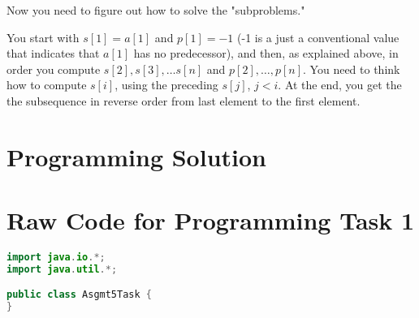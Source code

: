 \documentclass[11pt]{article}
\begin{document}
Now you need to figure out how to solve the "subproblems."

You start with $s[1] = a[1]$ and $p[1] = -1$ (-1 is a just a conventional value that indicates that $a[1]$ has no predecessor), and then, as explained above, in order you compute $s[2], s[3], \ldots s[n]$ and $p[2], \ldots, p[n]$. You need to think how to compute $s[i]$, using the preceding $s[j]$, $j < i$. At the end, you get the the subsequence in reverse order from last element to the first element.
\newpage
\section*{Programming Solution}

\newpage
\section*{Raw Code for Programming Task 1 }
\lstset{
    basicstyle=\ttfamily\footnotesize,
    breaklines=true,  %
    frame=single,     %
    numbers=left,     %
    tabsize=4,        %
    showstringspaces=false %
}
\begin{lstlisting}[language=Java]
import java.io.*;
import java.util.*;

public class Asgmt5Task {
}
\end{lstlisting}
\end{document}
